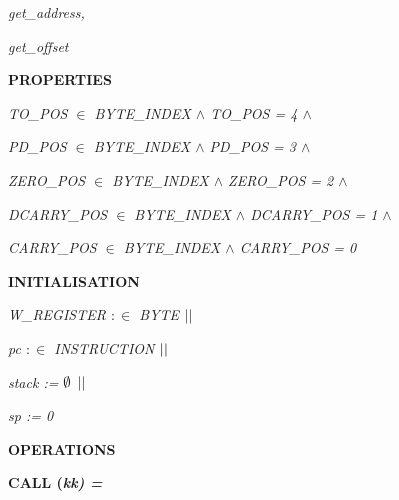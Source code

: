 \begin{sloppypar}
\vspace*{4mm}
\hspace*{0.20in} 

\hspace*{0.20in}\it get\_address\rm ,

\hspace*{0.20in}\it get\_offset

\vspace*{4mm}
\bf PROPERTIES

\vspace*{4mm}
\hspace*{0.20in} 

\hspace*{0.20in}\it TO\_POS  $\in$  \it BYTE\_INDEX  $\land$ \hspace*{0.20in}\it TO\_POS \rm = \rm 4  $\land$ 

\hspace*{0.20in}\it PD\_POS  $\in$  \it BYTE\_INDEX  $\land$ \hspace*{0.20in}\it PD\_POS \rm = \rm 3  $\land$ 

\hspace*{0.20in}\it ZERO\_POS  $\in$  \it BYTE\_INDEX  $\land$ \hspace*{0.20in}\it ZERO\_POS \rm = \rm 2  $\land$ 

\hspace*{0.20in}\it DCARRY\_POS  $\in$  \it BYTE\_INDEX  $\land$ \hspace*{0.20in}\it DCARRY\_POS \rm = \rm 1  $\land$ 

\hspace*{0.20in}\it CARRY\_POS  $\in$  \it BYTE\_INDEX  $\land$ \hspace*{0.20in}\it CARRY\_POS \rm = \rm 0

\vspace*{4mm}
\bf INITIALISATION

\hspace*{0.20in}\it W\_REGISTER  $:\in$  \it BYTE  $\mbox{$\mid\mid$}$ 

\hspace*{0.20in}\it pc  $:\in$  \it INSTRUCTION  $\mbox{$\mid\mid$}$ 

\hspace*{0.20in}\it stack \rm :=  $\emptyset$   $\mbox{$\mid\mid$}$ 

\hspace*{0.20in}\it sp \rm := \rm 0

\vspace*{4mm}
\bf OPERATIONS

\hspace*{0.20in}\bf CALL \rm (\it kk\rm ) \rm =


\end{sloppypar}
